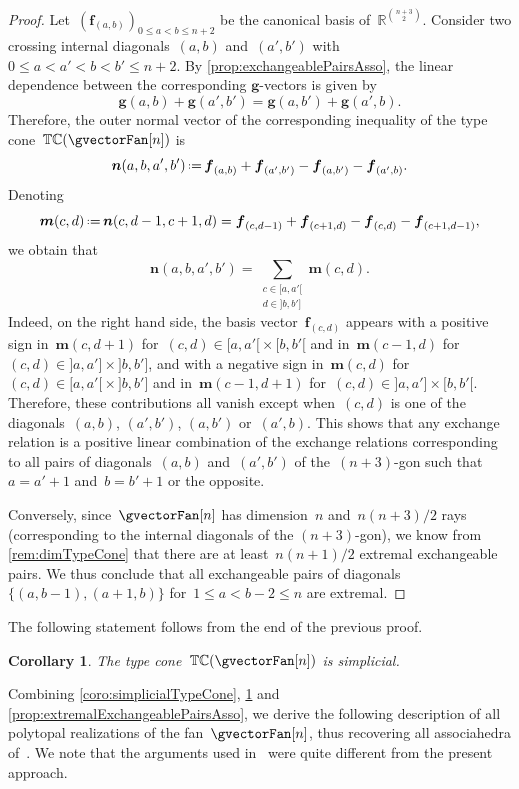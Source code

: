 \documentclass{amsart}
\newtheorem{corollary}[theorem]{Corollary}
\theoremstyle{definition}
\newcommand{\R}{\mathbb{R}} %
\renewcommand{\b}[1]{{\boldsymbol{#1}}} %
\newcommand{\eqdef}{\mbox{\,\raisebox{0.2ex}{\scriptsize\ensuremath{\mathrm:}}\ensuremath{=}\,}} %
\newcommand{\gvector}[1]{\b{g}(#1)} %
\newcommand{\typeCone}{\mathbb{TC}} %
\begin{document}
\begin{proof}
Let~$(\b{f}_{(a,b)})_{0 \le a < b \le n+2}$ be the canonical basis of~$\R^{\binom{n+3}{2}}$.
Consider two crossing internal diagonals~$(a,b)$ and~$(a',b')$ with~$0 \le a < a' < b < b' \le n+2$.
By \cref{prop:exchangeablePairsAsso}, the linear dependence between the corresponding $\b{g}$-vectors is given by
\[
\gvector{a,b} + \gvector{a',b'} = \gvector{a,b'} + \gvector{a',b}.
\]
Therefore, the outer normal vector of the corresponding inequality of the type cone~$\typeCone(\gvectorFan[n])$ is
\[
\b{n}(a,b,a',b') \eqdef \b{f}_{(a,b)} + \b{f}_{(a',b')} - \b{f}_{(a,b')} - \b{f}_{(a',b)}.
\]
Denoting
\[
\b{m}(c,d) \eqdef \b{n}(c,d-1,c+1,d) = \b{f}_{(c,d-1)} + \b{f}_{(c+1,d)} - \b{f}_{(c,d)} - \b{f}_{(c+1,d-1)},
\]
we obtain that
\[
\b{n}(a,b,a',b') = \sum_{\substack{c \in {[a,a'[} \\ d \in {]b,b']}}} \b{m}(c,d).
\]
Indeed, on the right hand side, the basis vector~$\b{f}_{(c,d)}$ appears with a positive sign in~$\b{m}(c,d+1)$ for~$(c,d) \in {[a,a'[} \times {[b,b'[}$ and in~$\b{m}(c-1,d)$ for~$(c,d) \in {]a,a']} \times {]b,b']}$, and with a negative sign in~$\b{m}(c,d)$ for~$(c,d) \in {[a,a'[} \times {]b,b']}$ and in~$\b{m}(c-1,d+1)$ for~$(c,d) \in {]a,a']} \times {[b,b'[}$.
Therefore, these contributions all vanish except when~$(c,d)$ is one of the diagonals~$(a,b)$, $(a',b')$, $(a,b')$ or~$(a',b)$.
This shows that any exchange relation is a positive linear combination of the exchange relations corresponding to all pairs of diagonals~$(a,b)$ and~$(a',b')$ of the~$(n+3)$-gon such that~$a = a'+1$ and~$b = b'+1$ or the opposite.

Conversely, since~$\gvectorFan[n]$ has dimension~$n$ and~$n(n+3)/2$ rays (corresponding to the internal diagonals of the $(n+3)$-gon), we know from \cref{rem:dimTypeCone} that there are at least~$n(n+1)/2$ extremal exchangeable pairs. We thus conclude that all exchangeable pairs of diagonals~$\{(a,b-1), (a+1,b)\}$ for~$1 \le a < b-2 \le n$ are extremal.
\end{proof}

The following statement follows from the end of the previous proof.

\begin{corollary}
\label{coro:simplicialTypeConeAsso}
The type cone~$\typeCone(\gvectorFan[n])$ is simplicial.
\end{corollary}

Combining \cref{coro:simplicialTypeCone}, \cref{coro:simplicialTypeConeAsso} and \cref{prop:extremalExchangeablePairsAsso}, we derive the following description of all polytopal realizations of the fan~$\gvectorFan[n]$, thus recovering all associahedra of~\cite[Sect.~3.2]{ArkaniHamedBaiHeYan}.
We note that the arguments used in~\cite[Sect.~3.2]{ArkaniHamedBaiHeYan} were quite different from the present approach.
\end{document}
